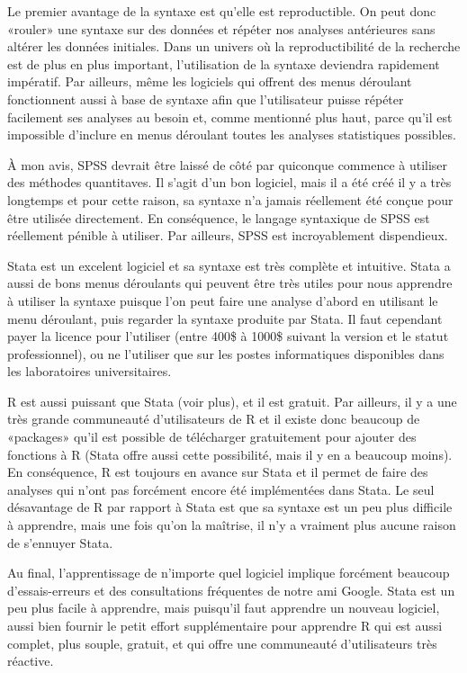 \documentclass[
]{book}
\begin{document}
Le premier avantage de la syntaxe est qu'elle est reproductible. On peut donc «rouler» une syntaxe sur des données et répéter nos analyses antérieures sans altérer les données initiales. Dans un univers où la reproductibilité de la recherche est de plus en plus important, l'utilisation de la syntaxe deviendra rapidement impératif. Par ailleurs, même les logiciels qui offrent des menus déroulant fonctionnent aussi à base de syntaxe afin que l'utilisateur puisse répéter facilement ses analyses au besoin et, comme mentionné plus haut, parce qu'il est impossible d'inclure en menus déroulant toutes les analyses statistiques possibles.

À mon avis, SPSS devrait être laissé de côté par quiconque commence à utiliser des méthodes quantitaves. Il s'agit d'un bon logiciel, mais il a été créé il y a très longtemps et pour cette raison, sa syntaxe n'a jamais réellement été conçue pour être utilisée directement. En conséquence, le langage syntaxique de SPSS est réellement pénible à utiliser. Par ailleurs, SPSS est incroyablement dispendieux.

Stata est un excelent logiciel et sa syntaxe est très complète et intuitive. Stata a aussi de bons menus déroulants qui peuvent être très utiles pour nous apprendre à utiliser la syntaxe puisque l'on peut faire une analyse d'abord en utilisant le menu déroulant, puis regarder la syntaxe produite par Stata. Il faut cependant payer la licence pour l'utiliser (entre 400\$ à 1000\$ suivant la version et le statut professionnel), ou ne l'utiliser que sur les postes informatiques disponibles dans les laboratoires universitaires.

R est aussi puissant que Stata (voir plus), et il est gratuit. Par ailleurs, il y a une très grande communeauté d'utilisateurs de R et il existe donc beaucoup de «packages» qu'il est possible de télécharger gratuitement pour ajouter des fonctions à R (Stata offre aussi cette possibilité, mais il y en a beaucoup moins). En conséquence, R est toujours en avance sur Stata et il permet de faire des analyses qui n'ont pas forcément encore été implémentées dans Stata. Le seul désavantage de R par rapport à Stata est que sa syntaxe est un peu plus difficile à apprendre, mais une fois qu'on la maîtrise, il n'y a vraiment plus aucune raison de s'ennuyer Stata.

Au final, l'apprentissage de n'importe quel logiciel implique forcément beaucoup d'essais-erreurs et des consultations fréquentes de notre ami Google. Stata est un peu plus facile à apprendre, mais puisqu'il faut apprendre un nouveau logiciel, aussi bien fournir le petit effort supplémentaire pour apprendre R qui est aussi complet, plus souple, gratuit, et qui offre une communeauté d'utilisateurs très réactive.
\end{document}
